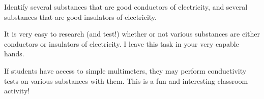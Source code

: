 

Identify several substances that are good conductors of electricity, and several substances that are good insulators of electricity.







It is very easy to research (and test!) whether or not various substances are either conductors or insulators of electricity.  I leave this task in your very capable hands.







If students have access to simple multimeters, they may perform conductivity tests on various substances with them.  This is a fun and interesting classroom activity!




